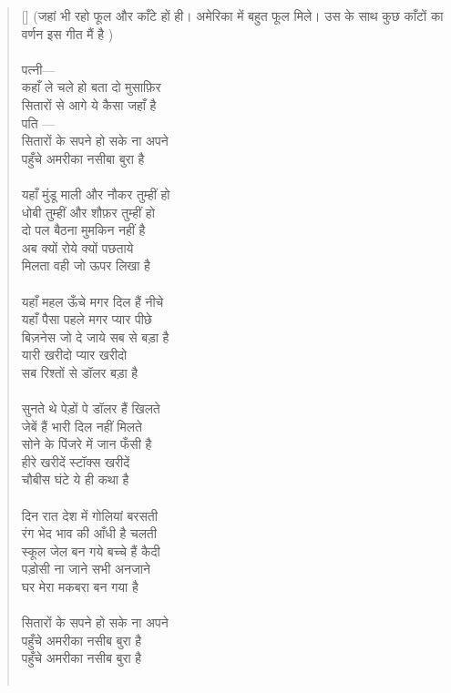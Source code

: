 \begin{verse}[\versewidth]\texthindi{
(जहां भी रहो फूल और काँटे हों ही। अमेरिका में बहुत फूल मिले। उस के साथ कुछ काँटों का वर्णन इस गीत मैं है
)\\
\\
पत्नी—\\
कहाँ ले चले हो बता दो मुसाफ़िर\\
सितारों से आगे ये कैसा जहाँ है\\
पति —\\
सितारों के सपने हो सके ना अपने\\
पहुँचे अमरीका नसीबा बुरा है\\
\\
यहाँ मुंडू माली और नौकर तुम्हीं हो\\
धोबी तुम्हीं और शौफ़र तुम्हीं हो\\
दो पल बैठना मुमकिन नहीं है\\
अब क्यों रोये क्यों पछताये\\
मिलता वही जो ऊपर लिखा है\\
\\
यहाँ महल ऊँचे मगर दिल हैं नीचे\\
यहाँ पैसा पहले मगर प्यार पीछे\\
बिज़नेस जो दे जाये सब से बड़ा है\\
यारी खरीदो प्यार खरीदो\\
सब रिश्तों से डॉलर बड़ा है\\
\\
सुनते थे पेड़ों पे डॉलर हैं खिलते\\
जेबें हैं भारी दिल नहीं मिलते\\
सोने के पिंजरे में जान फँसी है\\
हीरे खरीदें स्टॉक्स खरीदें\\
चौबीस घंटे ये ही कथा है\\
\\
दिन रात देश में गोलियां बरसती\\
रंग भेद भाव की आँधी है चलती\\
स्कूल जेल बन गये बच्चे हैं कैदी\\
पड़ोसी ना जाने सभी अनजाने\\
घर मेरा मकबरा बन गया है\\
\\
सितारों के सपने हो सके ना अपने\\
पहुँचे अमरीका नसीब बुरा है\\
पहुँचे अमरीका नसीब बुरा है\\
\\
}
\end{verse}
